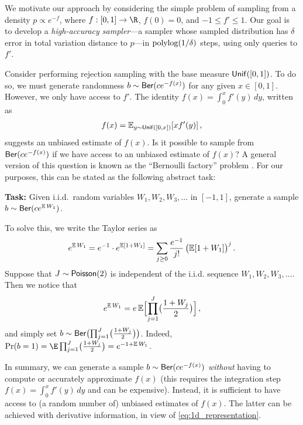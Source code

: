 



We motivate our approach by considering the simple problem of sampling from a density $p\propto e^{-f}$, where $f : [0,1]\to\R$, $f(0) = 0$, and $-1 \le f' \le 1$.
Our goal is to develop a \emph{high-accuracy sampler}---a sampler whose sampled distribution has $\delta$ error in total variation distance to $p$---in $\polylog(1/\delta)$ steps, using only queries to $f'$.

Consider performing rejection sampling with the base measure $\unif([0,1])$. To do so, we must generate randomness $b\sim \Ber(ce^{-f(x)})$ for any given $x\in[0,1]$. However, we only have access to $f'$. The identity $f(x)=\int_{0}^x f'(y)\,dy$, written as
\begin{align}
\label{eq:1d_representation}
    f(x)=\En_{y\sim \unif([0,x])}[xf'(y)]\,,
\end{align}
suggests an unbiased estimate of $f(x)$. Is it possible to sample from $\Ber(ce^{-f(x)})$ if we have access to an unbiased estimate of $f(x)$? A general version of this question is known as the ``Bernoulli factory'' problem \citep{keane1994bernoulli,nacu2005fast}. For our purposes, this can be stated as the following abstract task:
\begin{center}
    \textbf{Task:} Given i.i.d.\ random variables $W_1,W_2,W_3,\dotsc$ in $[-1,1]$, generate a sample $b\sim \Ber(ce^{\En W_1})$.
\end{center}
To solve this, we write the Taylor series as
\begin{align}\notag
    e^{\En W_1}=e^{-1}\cdot e^{\En[1+W_1]}
    =\sum_{j\geq 0} \frac{e^{-1}}{j!}\, \bigl(\En[1+W_1]\bigr)^j\,.
\end{align}
Suppose that $J\sim \Poi(2)$ is independent of the i.i.d. sequence $W_1,W_2,W_3,\dotsc$. Then we notice that
\begin{align}\notag
    e^{\En W_1}=e\En\brk[\Big]{\prod_{j=1}^J \bigl(\frac{1+W_j}{2}\bigr)}\,,
\end{align}
and simply set $b\sim \Ber\prn[\big]{\prod_{j=1}^J \bigl(\frac{1+W_j}{2}\bigr)}$.
Indeed, $\Pr(b=1) = \E\prod_{j=1}^J \bigl(\frac{1+W_j}{2}\bigr) = e^{-1+\En W_1}$.

In summary, we can generate a sample $b\sim \Ber\prn{ce^{-f(x)}}$ \emph{without} having to compute or accurately approximate $f(x)$ (this requires the integration step $f(x)=\int_{0}^x f'(y)\,dy$ and can be expensive). Instead, it is sufficient to have access to (a random number of) unbiased estimates of $f(x)$. The latter can be achieved with derivative information, in view of \eqref{eq:1d_representation}.

